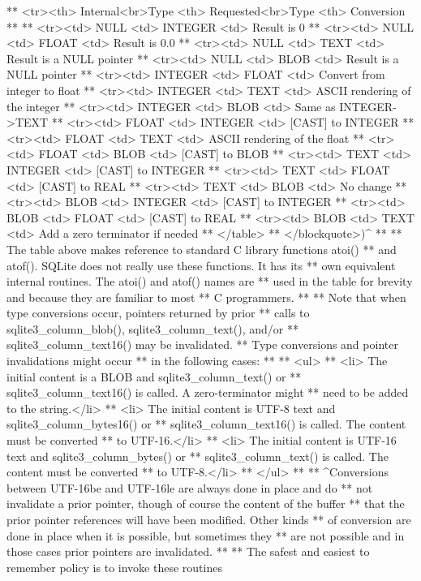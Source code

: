 \begin{Codex}[label=sqlite3.h,numbers=left]
{** <tr><th> Internal<br>Type <th> Requested<br>Type <th>  Conversion
**
** <tr><td>  NULL    <td> INTEGER   <td> Result is 0
** <tr><td>  NULL    <td>  FLOAT    <td> Result is 0.0
** <tr><td>  NULL    <td>   TEXT    <td> Result is a NULL pointer
** <tr><td>  NULL    <td>   BLOB    <td> Result is a NULL pointer
** <tr><td> INTEGER  <td>  FLOAT    <td> Convert from integer to float
** <tr><td> INTEGER  <td>   TEXT    <td> ASCII rendering of the integer
** <tr><td> INTEGER  <td>   BLOB    <td> Same as INTEGER->TEXT
** <tr><td>  FLOAT   <td> INTEGER   <td> [CAST] to INTEGER
** <tr><td>  FLOAT   <td>   TEXT    <td> ASCII rendering of the float
** <tr><td>  FLOAT   <td>   BLOB    <td> [CAST] to BLOB
** <tr><td>  TEXT    <td> INTEGER   <td> [CAST] to INTEGER
** <tr><td>  TEXT    <td>  FLOAT    <td> [CAST] to REAL
** <tr><td>  TEXT    <td>   BLOB    <td> No change
** <tr><td>  BLOB    <td> INTEGER   <td> [CAST] to INTEGER
** <tr><td>  BLOB    <td>  FLOAT    <td> [CAST] to REAL
** <tr><td>  BLOB    <td>   TEXT    <td> Add a zero terminator if needed
** </table>
** </blockquote>)^
**
** The table above makes reference to standard C library functions atoi()
** and atof().  SQLite does not really use these functions.  It has its
** own equivalent internal routines.  The atoi() and atof() names are
** used in the table for brevity and because they are familiar to most
** C programmers.
**
** Note that when type conversions occur, pointers returned by prior
** calls to sqlite3_column_blob(), sqlite3_column_text(), and/or
** sqlite3_column_text16() may be invalidated.
** Type conversions and pointer invalidations might occur
** in the following cases:
**
** <ul>
** <li> The initial content is a BLOB and sqlite3_column_text() or
**      sqlite3_column_text16() is called.  A zero-terminator might
**      need to be added to the string.</li>
** <li> The initial content is UTF-8 text and sqlite3_column_bytes16() or
**      sqlite3_column_text16() is called.  The content must be converted
**      to UTF-16.</li>
** <li> The initial content is UTF-16 text and sqlite3_column_bytes() or
**      sqlite3_column_text() is called.  The content must be converted
**      to UTF-8.</li>
** </ul>
**
** ^Conversions between UTF-16be and UTF-16le are always done in place and do
** not invalidate a prior pointer, though of course the content of the buffer
** that the prior pointer references will have been modified.  Other kinds
** of conversion are done in place when it is possible, but sometimes they
** are not possible and in those cases prior pointers are invalidated.
**
** The safest and easiest to remember policy is to invoke these routines
}
\end{Codex}
